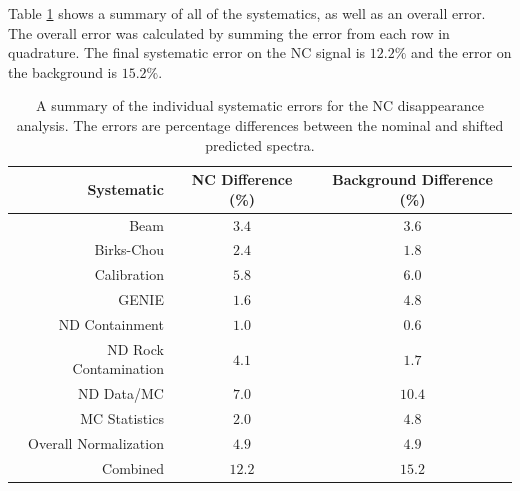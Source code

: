 Table \ref{tab:SystSummary} shows a summary of all of the systematics, as well as an overall error. The overall error was calculated by summing the error from each row in quadrature. The final systematic error on the NC signal is $12.2\%$ and the error on the background is $15.2\%$.
\begin{table}[htb]
  \begin{center}
    \caption[Systematic Error Summary]{A summary of the individual systematic errors for the NC disappearance analysis. The errors are percentage differences between the nominal and shifted predicted spectra.}
    \label{tab:SystSummary}
    \begin{tabular}{r c c}
      \hline\hline
      Systematic & NC Difference (\%) & Background Difference (\%) \\
      \hline
      Beam & $3.4$ & $3.6$ \\
      Birks-Chou & $2.4$ & $1.8$ \\
      Calibration & $5.8$ & $6.0$ \\
      GENIE & $1.6$ & $4.8$ \\
      ND Containment & $1.0$ & $0.6$ \\
      ND Rock Contamination & $4.1$ & $1.7$ \\
      ND Data/MC & $7.0$ & $10.4$ \\
      MC Statistics & $2.0$ & $4.8$ \\
      Overall Normalization & $4.9$ & $4.9$ \\
      \hline
      Combined & $12.2$ & $15.2$ \\
      \hline
    \end{tabular}
  \end{center}
\end{table}

